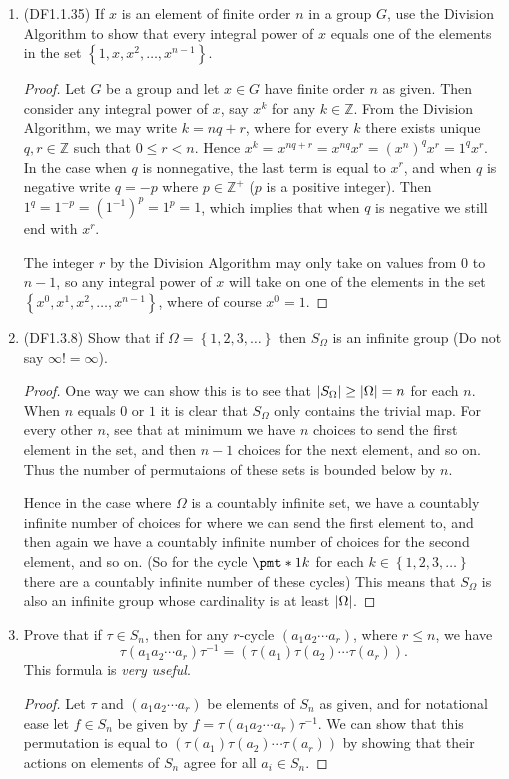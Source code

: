 \documentclass[11pt]{article}
\newcommand{\cbr}[1]{\left\{#1\right\}}
\begin{document}
\begin{enumerate}
    \item (DF1.1.35) If $x$ is an element of finite order $n$ in a group $G$, use the Division Algorithm to show that every integral power of $x$ equals one of the elements in the set $\cbr{1,x,x^2,\dots,x^{n-1}}$. \begin{proof}
      Let $G$ be a group and let $x\in G$ have finite order $n$ as given. Then consider any integral power of $x$, say $x^k$ for any $k\in \mathbb{Z}$. From the Division Algorithm, we may write $k = nq + r$, where for every $k$ there exists unique $q,r\in\mathbb{Z}$ such that $0\leq r < n$. Hence $x^k = x^{nq+r} = x^{nq}x^r = (x^n)^qx^r = 1^qx^r$. In the case when $q$ is nonnegative, the last term is equal to $x^r$, and when $q$ is negative write $q = -p$ where $p\in\mathbb{Z}^{+}$ ($p$ is a positive integer). Then $1^q = 1^{-p} = (1^{-1})^p = 1^p = 1$, which implies that when $q$ is negative we still end with $x^r$.
    
      The integer $r$ by the Division Algorithm may only take on values from $0$ to $n-1$, so any integral power of $x$ will take on one of the elements in the set $\cbr{x^0,x^1,x^2,\dots,x^{n-1}}$, where of course $x^0 = 1$.\end{proof}
    
    \item (DF1.3.8) Show that if $\Omega = \cbr{1,2,3,\dots}$ then $S_{\Omega}$ is an infinite group (Do not say $\infty! = \infty$). \begin{proof}
      One way we can show this is to see that $\abs{S_{\Omega}} \geq \abs{\Omega} = n$ for each $n$. When $n$ equals $0$ or $1$ it is clear that $S_{\Omega}$ only contains the trivial map. For every other $n$, see that at minimum we have $n$ choices to send the first element in the set, and then $n-1$ choices for the next element, and so on. Thus the number of permutaions of these sets is bounded below by $n$.
    
      Hence in the case where $\Omega$ is a countably infinite set, we have a countably infinite number of choices for where we can send the first element to, and then again we have a countably infinite number of choices for the second element, and so on. (So for the cycle $\pmt*{1k}$ for each $k\in \cbr{1,2,3,\dots}$ there are a countably infinite number of these cycles) This means that $S_{\Omega}$ is also an infinite group whose cardinality is at least $\abs{\Omega}$.\end{proof}
    
    \item Prove that if $\tau\in S_n$, then for any $r$-cycle $(a_1a_2\cdots a_r)$, where $r\leq n$, we have \[\tau(a_1a_2\cdots a_r)\tau^{-1} = (\tau(a_1)\tau(a_2)\cdots\tau(a_r)).\] This formula is \textit{very useful}. \begin{proof} Let $\tau$ and $(a_1a_2\cdots a_r)$ be elements of $S_n$ as given, and for notational ease let $f\in S_n$ be given by $f = \tau(a_1a_2\cdots a_r)\tau^{-1}$. We can show that this permutation is equal to $(\tau(a_1)\tau(a_2)\cdots\tau(a_r))$ by showing that their actions on elements of $S_n$ agree for all $a_i\in S_n$.
    

\end{proof}
\end{enumerate}
\end{document}
